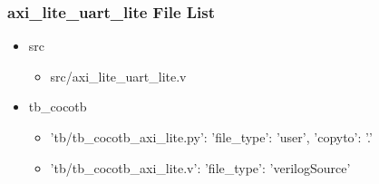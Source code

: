 \subsubsection{axi\_lite\_uart\_lite File List}
\begin{itemize}
\item src
	\begin{itemize}
	\item src/axi\_lite\_uart\_lite.v
	\end{itemize}
\item tb\_cocotb
	\begin{itemize}
	\item {'tb/tb\_cocotb\_axi\_lite.py': {'file\_type': 'user', 'copyto': '.'}}
	\item {'tb/tb\_cocotb\_axi\_lite.v': {'file\_type': 'verilogSource'}}
	\end{itemize}
\end{itemize}
